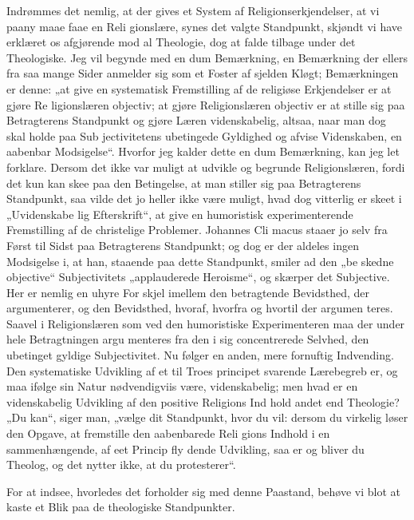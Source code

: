 \documentclass[12pt]{book}
\newcommand{\opage}[1]{\marginnote{\footnotesize\textit{[#1]}}}
\begin{document}
Indrømmes det nemlig, at der gives et System af
Religionserkjendelser, at vi paany maae faae en Reli\-%
gionslære, synes det valgte Standpunkt, skjøndt vi have
erklæret os afgjørende mod al Theologie, dog at falde
tilbage under det Theologiske. Jeg vil begynde med
en dum Bemærkning, en Bemærkning der ellers fra saa\-%
mange Sider anmelder sig som et Foster af sjelden
Kløgt; Bemærkningen er denne: „at give en systematisk
Fremstilling af de religiøse Erkjendelser er at gjøre Re\-%
ligionslæren objectiv; at gjøre Religionslæren objectiv er
at stille sig paa Betragterens Standpunkt og gjøre Læren
videnskabelig, altsaa, naar man dog skal holde paa Sub\-%
jectivitetens ubetingede Gyldighed og afvise Videnskaben,
en aabenbar Modsigelse“. Hvorfor jeg kalder dette en
dum Bemærkning, kan jeg let forklare. Dersom det ikke
var muligt at udvikle og begrunde Religionslæren, fordi
det kun kan skee paa den Betingelse, at man stiller sig
paa Betragterens Standpunkt, saa vilde det jo heller ikke
være muligt, hvad dog vitterlig er skeet i „Uvidenskabe\-%
lig Efterskrift“, at give en humoristisk experimenterende
Fremstilling af de christelige Problemer. Johannes Cli\-%
macus staaer jo selv fra Først til Sidst paa Betragterens
Standpunkt; og dog er der aldeles ingen Modsigelse i, at
han, staaende paa dette Standpunkt, smiler ad den „be\-%
\opage{236}\setcounter{footnote}{0}%
skedne objective“ Subjectivitets „applauderede Heroisme“,
og skærper det Subjective. Her er nemlig en uhyre For\-%
skjel imellem den betragtende Bevidsthed, der argumenterer,
og den Bevidsthed, hvoraf, hvorfra og hvortil der argumen\-%
teres. Saavel i Religionslæren som ved den humoristiske
Experimenteren maa der under hele Betragtningen argu\-%
menteres fra den i sig concentrerede Selvhed, den ubetinget
gyldige Subjectivitet. Nu følger en anden, mere fornuftig
Indvending. Den systematiske Udvikling af et til Troes\-%
principet svarende Lærebegreb er, og maa ifølge sin
Natur nødvendigviis være, videnskabelig; men hvad er
en videnskabelig Udvikling af den positive Religions Ind\-%
hold andet end Theologie? „Du kan“, siger man,
„vælge dit Standpunkt, hvor du vil: dersom du virkelig
løser den Opgave, at fremstille den aabenbarede Reli\-%
gions Indhold i en sammenhængende, af eet Princip fly\-%
dende Udvikling, saa er og bliver du Theolog, og det
nytter ikke, at du protesterer“.

For at indsee, hvorledes det forholder sig med
denne Paastand, behøve vi blot at kaste et Blik paa de
theologiske Standpunkter.
\end{document}
